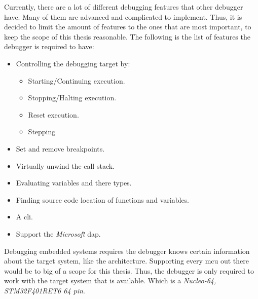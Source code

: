 

Currently, there are a lot of different debugging features that other debugger have.
Many of them are advanced and complicated to implement.
Thus, it is decided to limit the amount of features to the ones that are most important, to keep the scope of this thesis reasonable.
The following is the list of features the debugger is required to have:

\begin{itemize} \label{list:debuggerfeatures}
  \item Controlling the debugging target by:
  \begin{itemize}
    \item Starting/Continuing execution.
    \item Stopping/Halting execution.
    \item Reset execution.
    \item Stepping
  \end{itemize}
  \item Set and remove breakpoints.
  \item Virtually unwind the call stack.
  \item Evaluating variables and there types.
  \item Finding source code location of functions and variables.
  \item A \acrfull{cli}.
  \item Support the \emph{Microsoft} \acrfull{dap}.
\end{itemize}


Debugging embedded systems requires the debugger knows certain information about the target system, like the architecture.
Supporting every \gls{mcu} out there would be to big of a scope for this thesis.
Thus, the debugger is only required to work with the target system that is available.
Which is a \emph{Nucleo-64, STM32F401RET6 64 pin}.

%

